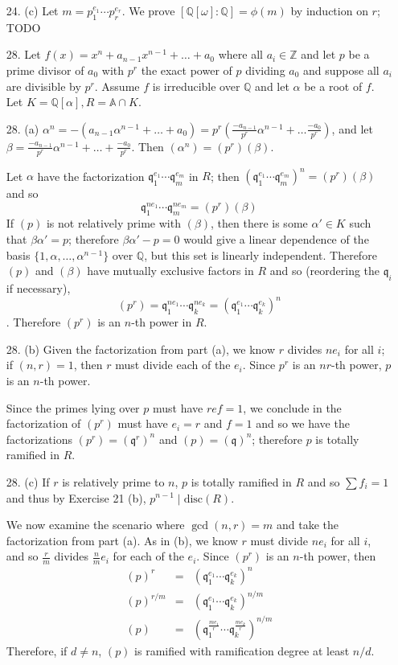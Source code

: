 \documentclass{article}
\newcommand{\w}[0]{\omega}
\newcommand{\Q}[0]{\mathbb{Q}}
\newcommand{\Z}[0]{\mathbb{Z}}
\newcommand{\q}[0]{\mathfrak{q}}
\newcommand{\disc}[1]{\text{disc}(#1)}
\newcommand{\ringofintegers}[1]{\mathbb{A} \cap #1}
\begin{document}
\begin{enumerate}
\item[24. (c)] Let $m = p_1^{e_1} \cdots p_r^{e_r}$.  We prove $[\Q[\w] : \Q] = \phi(m)$ by induction on $r$; TODO

\item[28.] Let $f(x) = x^n + a_{n-1}x^{n-1} + \ldots + a_0$ where all $a_i \in \Z$ and let $p$ be a prime divisor of $a_0$ with $p^r$ the exact power of $p$ dividing $a_0$ and suppose all $a_i$ are divisible by $p^r$.  Assume $f$ is irreducible over $\Q$ and let $\alpha$ be a root of $f$.  Let $K = \Q[\alpha], R = \ringofintegers{K}$.
\item[28. (a)] $\alpha^n = -(a_{n-1}\alpha^{n-1} + \ldots + a_0) = p^r(\frac{-a_{n-1}}{p^r}\alpha^{n-1} + \ldots \frac{-a_0}{p^r})$, and let $\beta = \frac{-a_{n-1}}{p^r}\alpha^{n-1} + \ldots + \frac{-a_0}{p^r}$.  Then $(\alpha^n) = (p^r)(\beta)$.

Let $\alpha$ have the factorization $\q_1^{e_1} \cdots \q_m^{e_m}$ in $R$; then $(\q_1^{e_1} \cdots \q_m^{e_m})^n = (p^r)(\beta)$ and so \[ \q_1^{n e_1} \cdots \q_m^{n e_m} = (p^r)(\beta) \]
If $(p)$ is not relatively prime with $(\beta)$, then there is some $\alpha' \in K$ such that $\beta\alpha' = p$; therefore $\beta\alpha' - p = 0$ would give a linear dependence of the basis $\{1, \alpha, \ldots, \alpha^{n-1}\}$ over $\Q$, but this set is linearly independent.  Therefore $(p)$ and $(\beta)$ have mutually exclusive factors in $R$ and so (reordering the $\q_i$ if necessary), \[ (p^r) = \q_{1}^{n e_1} \cdots \q_{k}^{n e_k} = \left(\q_1^{e_1} \cdots \q_k^{e_k}\right)^n \].
Therefore $(p^r)$ is an $n$-th power in $R$.

\item[28. (b)] Given the factorization from part (a), we know $r$ divides $ne_i$ for all $i$; if $(n, r) = 1$, then $r$ must divide each of the $e_i$.  Since $p^r$ is an $nr$-th power, $p$ is an $n$-th power.

Since the primes lying over $p$ must have $ref = 1$, we conclude in the factorization of $(p^r)$ must have $e_i = r$ and $f = 1$ and so we have the factorizations $(p^r) = \left(\q^r\right)^n$ and $(p) = \left(\q\right)^n$; therefore $p$ is totally ramified in $R$.

\item[28. (c)] If $r$ is relatively prime to $n$, $p$ is totally ramified in $R$ and so $\sum f_i = 1$ and thus by Exercise 21 (b), $p^{n - 1} \mid \disc{R}$.

We now examine the scenario where $\gcd(n, r) = m$ and take the factorization from part (a).  As in (b), we know $r$ must divide $ne_i$ for all $i$, and so $\frac{r}{m}$ divides $\frac{n}{m}e_i$ for each of the $e_i$.  Since $(p^r)$ is an $n$-th power, then
\begin{eqnarray*}
(p)^r &=& \left(\q_1^{e_1} \cdots \q_k^{e_k}\right)^n \\
(p)^{r / m} &=& \left(\q_1^{e_1} \cdots \q_k^{e_k}\right)^{n / m}\\
(p) &=& \left(\q_1^{\frac{m e_1}{r}} \cdots \q_k^{\frac{m e_k}{r}}\right)^{n / m}
\end{eqnarray*}
Therefore, if $d \neq n$, $(p)$ is ramified with ramification degree at least $n / d$.


\end{enumerate}
\end{document}
